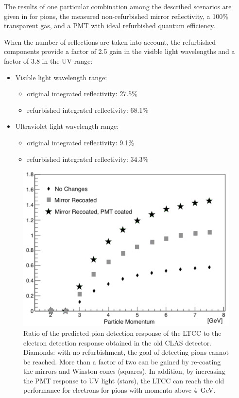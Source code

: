 The results of one particular combination among the described scenarios are given in  for pions,
the measured non-refurbished mirror reflectivity, a 100\% transparent gas, and a PMT with ideal refurbished
quantum efficiency.

When the number of reflections are taken into account, the refurbished components provide a factor of 2.5 gain in the visible
light wavelengths and a factor of 3.8 in the UV-range:

\begin{itemize}
	\item Visible light wavelength range:
	\begin{itemize}
		\item original integrated reflectivity: 27.5\%
		\item refurbished integrated reflectivity: 68.1\%
	\end{itemize}
	\item Ultraviolet light wavelength range:
	\begin{itemize}
		\item original integrated reflectivity: 9.1\%
		\item refurbished integrated reflectivity: 34.3\%
	\end{itemize}
\end{itemize}

\begin{figure}[htbp]
	\centering
	\includegraphics[width=0.99\columnwidth, height=0.7\columnwidth]{img/refurbishmentGains.png}
	\caption{Ratio of the predicted pion detection response of the LTCC to the electron detection
             response obtained in the old CLAS detector. Diamonds: with no
          refurbishment, the goal of detecting pions cannot be reached. More than a factor of two can be gained by
          re-coating the mirrors and Winston cones (squares). In addition, by increasing the PMT response to UV light
          (stars), the LTCC can reach the old performance for electrons for pions with momenta above 4~GeV.}
	\label{fig:refurbishmentGains}
\end{figure}

